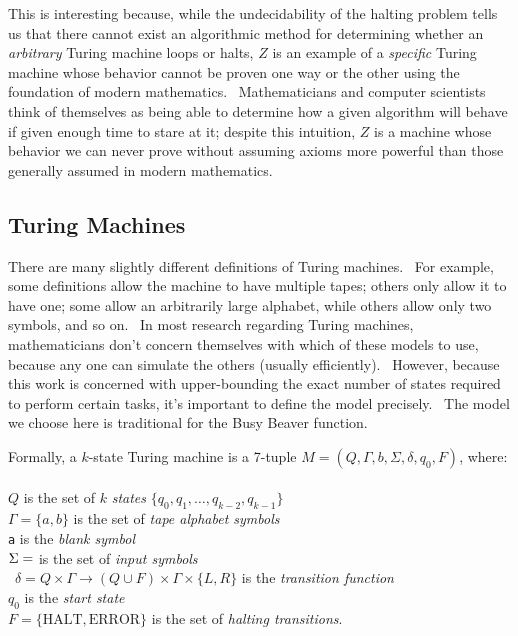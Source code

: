 \documentclass[11pt]{article}
\begin{document}
This is interesting because, while the undecidability of the halting problem tells us that there cannot exist an algorithmic method for determining whether an \emph{arbitrary} Turing machine loops or halts, $Z$ is an example of a \emph{specific} Turing machine whose behavior cannot be proven one way or the other using the foundation of modern mathematics. \ Mathematicians and computer scientists think of themselves as being able to determine how a given algorithm will behave if given enough time to stare at it; despite this intuition, $Z$ is a machine whose behavior we can never prove without assuming axioms more powerful than those generally assumed in modern mathematics.

\subsection{Turing Machines \label{sec:tm}}

There are many slightly different definitions of Turing machines. \ For example, some definitions allow the machine to have multiple tapes; others only allow it to have one; some allow an arbitrarily large alphabet, while others allow only two symbols, and so on. \ In most research regarding Turing machines, mathematicians don't concern themselves with which of these models to use, because any one can simulate the others (usually efficiently). \ However, because this work is concerned with upper-bounding the exact number of states required to perform certain tasks, it's important to define the model precisely. \ The model we choose here is traditional for the Busy Beaver function. 

Formally, a $k$-state Turing machine is a 7-tuple $M = (Q, \Gamma, b, \Sigma, \delta, q_0, F)$, where: \\ \\
$Q$ is the set of $k$ \emph{states} $\{q_0, q_1, \dots, q_{k-2}, q_{k-1}\}$ \\
$\Gamma = \{a, b\}$ is the set of \emph{tape alphabet symbols} \\
\texttt{a} is the \emph{blank symbol} \\
$\Sigma = \empty$ is the set of \emph{input symbols} \\\
$\delta = Q \times \Gamma \rightarrow (Q \cup F) \times \Gamma \times \{L, R\}$ is the \emph{transition function} \\
$q_0$ is the \emph{start state} \\
$F = \{\textrm{HALT}, \textrm{ERROR}\}$ is the set of \emph{halting transitions}. \\
\end{document}

